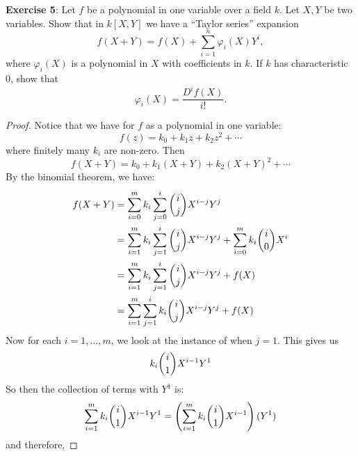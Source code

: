\documentclass{article}
\begin{document}
\textbf{Exercise 5}: Let $f$ be a polynomial in one variable over a field $k$. Let $X, Y$ be two variables. Show that in $k[X, Y]$ we have a ``Taylor series'' expansion 
    \begin{equation*}
        f(X + Y) = f(X) + \sum_{i = 1}^{n}\varphi_{i}(X)Y^{i},
    \end{equation*}
where $\varphi_{i}(X)$ is a polynomial in $X$ with coefficients in $k$. If $k$ has characteristic $0$, show that
    \begin{equation*}
        \varphi_{i}(X) = \dfrac{D^{i}f(X)}{i!}.
    \end{equation*}
    \begin{proof}
        Notice that we have for $f$ as a polynomial in one variable:
            \begin{equation*}
                f(z) = k_{0} + k_{1}z + k_{2}z^{2} + \cdots 
            \end{equation*}
        where finitely many $k_{i}$ are non-zero. Then
            \begin{equation*}
                f(X + Y) = k_{0} + k_{1}(X + Y) + k_{2}(X + Y)^{2} + \cdots 
            \end{equation*}
        By the binomial theorem, we have:
            \begin{align*}
                f(X + Y) &= \sum_{i = 0}^{m}k_{i}\sum_{j = 0}^{i} \dbinom{i}{j}X^{i - j}Y^{j} \\
                         &= \sum_{i = 1}^{m}k_{i}\sum_{j = 1}^{i}\dbinom{i}{j}X^{i - j}Y^{j} + \sum_{i = 0}^{m}k_{i}\dbinom{i}{0}X^{i} \\
                         &= \sum_{i = 1}^{m}k_{i}\sum_{j = 1}^{i}\dbinom{i}{j}X^{i - j}Y^{j} + f(X) \\
                         &= \sum_{i = 1}^{m}\sum_{j = 1}^{i}k_{i}\dbinom{i}{j}X^{i - j}Y^{j} + f(X)
            \end{align*}
        Now for each $i = 1, \ldots , m$, we look at the instance of when $j = 1$. This gives us 
            \begin{equation*}
                k_{i}\dbinom{i}{1}X^{i - 1}Y^{1}
            \end{equation*}
        So then the collection of terms with $Y^{1}$ is:
            \begin{equation*}
                \sum_{i = 1}^{m}k_{i}\dbinom{i}{1}X^{i - 1}Y^{1} = \left(\sum_{i = 1}^{m}k_{i}\dbinom{i}{1}X^{i - 1}\right)(Y^{1})
            \end{equation*}
        and therefore,

\end{proof}
\end{document}
